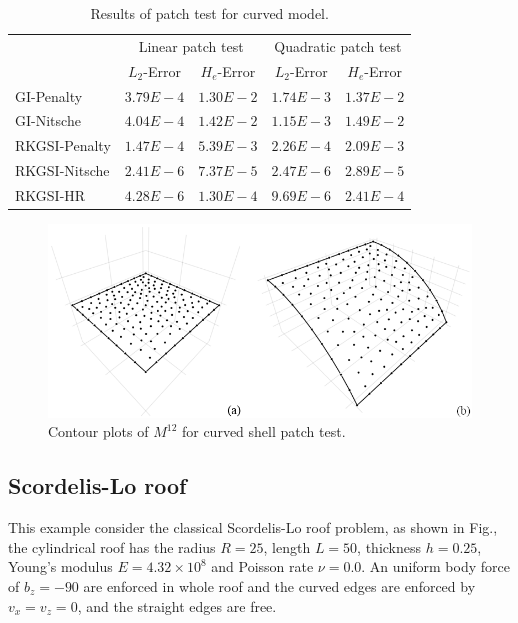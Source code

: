 \begin{table}[h!]
\centering
\caption{Results of patch test for curved model.}\label{ptt2}
\begin{tabular}{lcccc}
\toprule
 & \multicolumn{2}{c}{Linear patch test} & \multicolumn{2}{c}{Quadratic patch test} \\ \cline{2-5}
 & $L_2$-Error & $H_e$-Error & $L_2$-Error & $H_e$-Error \\
    \midrule
    GI-Penalty & $3.79E-4$ & $1.30E-2$ & $1.74E-3$ & $1.37E-2$ \\
    GI-Nitsche & $4.04E-4$ & $1.42E-2$ & $1.15E-3$ & $1.49E-2$ \\
    RKGSI-Penalty & $1.47E-4$ & $5.39E-3$ & $2.26E-4$ & $2.09E-3$ \\
    RKGSI-Nitsche & $2.41E-6$ & $7.37E-5$ & $2.47E-6$ & $2.89E-5$ \\
    RKGSI-HR & $4.28E-6$ & $1.30E-4$ & $9.69E-6$ & $2.41E-4$ \\
    \bottomrule
\end{tabular}
\end{table}

\begin{figure}[h!]
\centering
\includegraphics[width=\textwidth]{figures/patchtest_msh}
\caption{Contour plots of $M^{12}$ for curved shell patch test.}\label{ptf2}
\end{figure}

\subsection{Scordelis-Lo roof}
This example consider the classical Scordelis-Lo roof problem, as shown in Fig., the cylindrical roof has the radius $R=25$, length $L=50$, thickness $h=0.25$, Young's modulus $E=4.32\times 10^8$ and Poisson rate $\nu=0.0$. An uniform body force of $b_z = -90$ are enforced in whole roof and the curved edges are enforced by $v_x=v_z=0$, and the straight edges are free.


